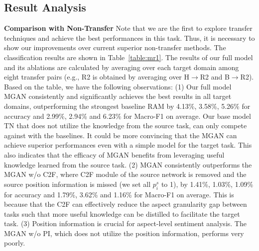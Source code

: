 \documentclass[letterpaper]{article} \usepackage{aaai19}  \usepackage{times}  \usepackage{latexsym}
\begin{document}
\subsection{Result Analysis}
\noindent \textbf{Comparison with Non-Transfer}
Note that we are the first to explore transfer techniques and achieve the best performances in this task. Thus, it is necessary to show our improvements over current superior non-transfer methods. The classification results are shown in Table~\ref{table:mr1}. The results of our full model and its ablations are calculated by averaging over each target domain among eight transfer pairs (e.g., R2 is obtained by averaging over H$\rightarrow$R2 and B$\rightarrow$R2). Based on the table, we have the following observations: (1) Our full model MGAN consistently and significantly achieves the best results in all target domains, outperforming the strongest baseline RAM by 4.13\%, 3.58\%, 5.26\% for accuracy and 2.99\%, 2.94\% and 6.23\% for Macro-F1 on average. Our base model TN that does not utilize the knowledge from the source task, can only compete against with the baselines. It could be more convincing that the MGAN can achieve superior performances even with a simple model for the target task. This also indicates that the efficacy of MGAN benefits from leveraging useful knowledge learned from the source task. (2) MGAN consistently outperforms the MGAN w/o C2F, where C2F module of the source network is removed and the source position information is missed (we set all ${ p }^{ s }_{i}$ to 1), by 1.41\%, 1.03\%, 1.09\% for accuracy and 1.79\%, 3.62\% and 1.16\% for Macro-F1 on average. This is because that the C2F can effectively reduce the aspect granularity gap between tasks such that more useful knowledge can be distilled to facilitate the target task. (3) Position information is crucial for aspect-level sentiment analysis. The MGAN w/o PI, which does not utilize the position information, performs very poorly.
\end{document}
